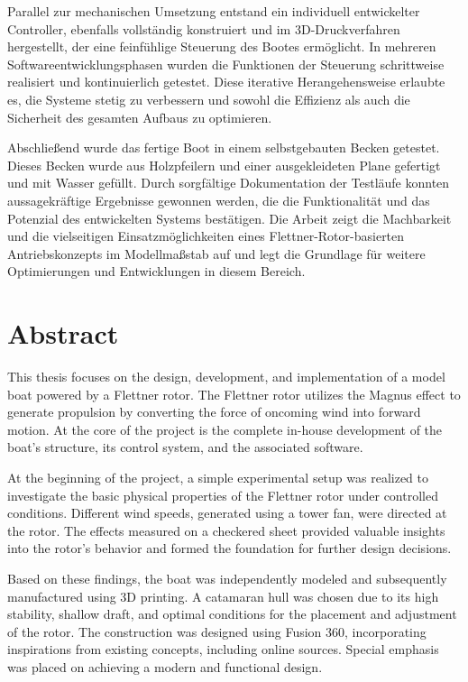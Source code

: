 \documentclass[a4paper,12pt]{article}
\begin{document}
Parallel zur mechanischen Umsetzung entstand ein individuell entwickelter Controller, ebenfalls vollständig konstruiert und im 3D-Druckverfahren hergestellt, der eine feinfühlige Steuerung des Bootes ermöglicht. In mehreren Softwareentwicklungsphasen wurden die Funktionen der Steuerung schrittweise realisiert und kontinuierlich getestet. Diese iterative Herangehensweise erlaubte es, die Systeme stetig zu verbessern und sowohl die Effizienz als auch die Sicherheit des gesamten Aufbaus zu optimieren.\newline

Abschließend wurde das fertige Boot in einem selbstgebauten Becken getestet. Dieses Becken wurde aus Holzpfeilern und einer ausgekleideten Plane gefertigt und mit Wasser gefüllt. Durch sorgfältige Dokumentation der Testläufe konnten aussagekräftige Ergebnisse gewonnen werden, die die Funktionalität und das Potenzial des entwickelten Systems bestätigen. Die Arbeit zeigt die Machbarkeit und die vielseitigen Einsatzmöglichkeiten eines Flettner-Rotor-basierten Antriebskonzepts im Modellmaßstab auf und legt die Grundlage für weitere Optimierungen und Entwicklungen in diesem Bereich.

\newpage

\section*{Abstract}
This thesis focuses on the design, development, and implementation of a model boat powered by a Flettner rotor. The Flettner rotor utilizes the Magnus effect to generate propulsion by converting the force of oncoming wind into forward motion. At the core of the project is the complete in-house development of the boat's structure, its control system, and the associated software.\newline

At the beginning of the project, a simple experimental setup was realized to investigate the basic physical properties of the Flettner rotor under controlled conditions. Different wind speeds, generated using a tower fan, were directed at the rotor. The effects measured on a checkered sheet provided valuable insights into the rotor's behavior and formed the foundation for further design decisions.\newline

Based on these findings, the boat was independently modeled and subsequently manufactured using 3D printing. A catamaran hull was chosen due to its high stability, shallow draft, and optimal conditions for the placement and adjustment of the rotor. The construction was designed using Fusion 360, incorporating inspirations from existing concepts, including online sources. Special emphasis was placed on achieving a modern and functional design.
\end{document}
